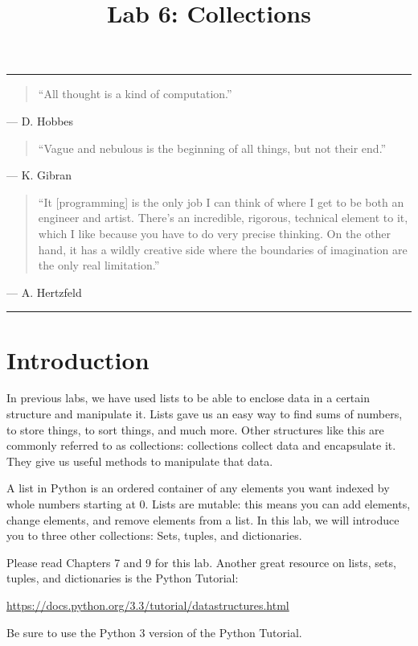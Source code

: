 \documentclass[11pt]{cselabheader}
\title{Lab 6: Collections}
\begin{document}
\maketitle

\hrule
\begin{quotation}
``All thought is a kind of computation.''
\end{quotation}
\begin{flushright}
--- D. Hobbes
\end{flushright}

\begin{quotation}
``Vague and nebulous is the beginning of all things, but not their end.''
\end{quotation}
\begin{flushright}
--- K. Gibran
\end{flushright}

\begin{quotation}
``It [programming] is the only job I can think of where I get to be both an
engineer and artist. There's an incredible, rigorous, technical element to it,
which I like because you have to do very precise thinking. On the other hand, it
has a wildly creative side where the boundaries of imagination are the only real
limitation.''
\end{quotation}
\begin{flushright}
--- A. Hertzfeld
\end{flushright}

\hrule

\section{Introduction}

In previous labs, we have used lists to be able to enclose data in a certain
structure and manipulate it. Lists gave us an easy way to find sums of numbers,
to store things, to sort things, and much more. Other structures like this are
commonly referred to as collections: collections collect data and encapsulate
it. They give us useful methods to manipulate that data.

A list in Python is an ordered container of any elements you want indexed by
whole numbers starting at 0. Lists are mutable: this means you can add elements,
change elements, and remove elements from a list. In this lab, we will introduce
you to three other collections: Sets, tuples, and dictionaries. 

Please read Chapters 7 and 9 for this lab. Another great resource on lists,
sets, tuples, and dictionaries is the Python Tutorial:
\begin{center}
  \url{https://docs.python.org/3.3/tutorial/datastructures.html}
\end{center}
Be sure to use the Python 3 version of the Python Tutorial.
\end{document}
